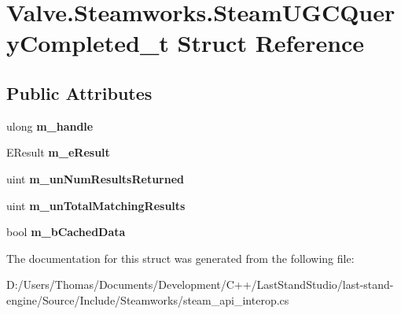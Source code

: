 \hypertarget{structValve_1_1Steamworks_1_1SteamUGCQueryCompleted__t}{}\section{Valve.\+Steamworks.\+Steam\+U\+G\+C\+Query\+Completed\+\_\+t Struct Reference}
\label{structValve_1_1Steamworks_1_1SteamUGCQueryCompleted__t}
\subsection*{Public Attributes}
\begin{DoxyCompactItemize}
\item 
\hypertarget{structValve_1_1Steamworks_1_1SteamUGCQueryCompleted__t_ab6d2520ebc2601dee573980c75b00ee7}{}ulong {\bfseries m\+\_\+handle}\label{structValve_1_1Steamworks_1_1SteamUGCQueryCompleted__t_ab6d2520ebc2601dee573980c75b00ee7}

\item 
\hypertarget{structValve_1_1Steamworks_1_1SteamUGCQueryCompleted__t_ac1567df6c9e73a7e687466d68de90718}{}E\+Result {\bfseries m\+\_\+e\+Result}\label{structValve_1_1Steamworks_1_1SteamUGCQueryCompleted__t_ac1567df6c9e73a7e687466d68de90718}

\item 
\hypertarget{structValve_1_1Steamworks_1_1SteamUGCQueryCompleted__t_a9762860ed6abe0d6fb47aa5ac49d06fd}{}uint {\bfseries m\+\_\+un\+Num\+Results\+Returned}\label{structValve_1_1Steamworks_1_1SteamUGCQueryCompleted__t_a9762860ed6abe0d6fb47aa5ac49d06fd}

\item 
\hypertarget{structValve_1_1Steamworks_1_1SteamUGCQueryCompleted__t_aab1f6ede0778d1a8735e4de2a73eb27c}{}uint {\bfseries m\+\_\+un\+Total\+Matching\+Results}\label{structValve_1_1Steamworks_1_1SteamUGCQueryCompleted__t_aab1f6ede0778d1a8735e4de2a73eb27c}

\item 
\hypertarget{structValve_1_1Steamworks_1_1SteamUGCQueryCompleted__t_a35926ae487b7dc5ca7ad2ab974e7c297}{}bool {\bfseries m\+\_\+b\+Cached\+Data}\label{structValve_1_1Steamworks_1_1SteamUGCQueryCompleted__t_a35926ae487b7dc5ca7ad2ab974e7c297}

\end{DoxyCompactItemize}


The documentation for this struct was generated from the following file\+:\begin{DoxyCompactItemize}
\item 
D\+:/\+Users/\+Thomas/\+Documents/\+Development/\+C++/\+Last\+Stand\+Studio/last-\/stand-\/engine/\+Source/\+Include/\+Steamworks/steam\+\_\+api\+\_\+interop.\+cs\end{DoxyCompactItemize}
